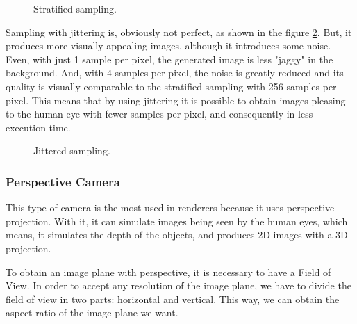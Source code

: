 \begin{figure}[H]
	\centering
	\qquad
	\caption{Stratified sampling.}
	\label{Sampling_Stratified.}
\end{figure}

\par
Sampling with jittering is, obviously not perfect, as shown in the figure \ref{Sampling_Jittering.}.
But, it produces more visually appealing images, although it introduces some noise.
Even, with just 1 sample per pixel, the generated image is less "jaggy" in the background.
And, with 4 samples per pixel, the noise is greatly reduced and its quality is visually comparable to the stratified sampling with 256 samples per pixel.
This means that by using jittering it is possible to obtain images pleasing to the human eye with fewer samples per pixel, and consequently in less execution time.

\begin{figure}[H]
	\centering
	\qquad
	\caption{Jittered sampling.}
	\label{Sampling_Jittering.}
\end{figure}


\subsubsection{Perspective Camera}

\par
This type of camera is the most used in renderers because it uses perspective projection.
With it, it can simulate images being seen by the human eyes, which means, it simulates the depth of the objects, and produces 2D images with a 3D projection.

\par
To obtain an image plane with perspective, it is necessary to have a Field of View.
In order to accept any resolution of the image plane, we have to divide the field of view in two parts: horizontal and vertical.
This way, we can obtain the aspect ratio of the image plane we want.

